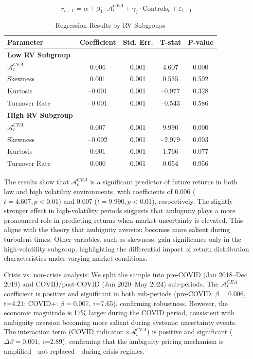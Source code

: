 \documentclass[preprint,12pt,authoryear]{elsarticle}
\renewcommand{\textcolor}[2]{\begingroup\color{#1}#2\endgroup}
\begin{document}
\begin{equation}
r_{t+1} = \alpha + \beta_1 \cdot \mathcal{A}^{CEA}_t + \gamma_1 \cdot \mathrm{Controls}_t + \varepsilon_{t+1}
\end{equation}

\begin{table}[h!]
\centering
\caption{Regression Results by RV Subgroups}
\label{tab:rv_subgroup_results}
\begin{tabularx}{\textwidth}{Xcccc}
\toprule
\textbf{Parameter} & \textbf{Coefficient} & \textbf{Std. Err.} & \textbf{T-stat} & \textbf{P-value} \\
\midrule
\textbf{Low RV Subgroup} & & & & \\
\(\mathcal{A}^{CEA}_t\) & 0.006 & 0.001 & 4.607 & 0.000 \\
Skewness & 0.001 & 0.001 & 0.535 & 0.592 \\
Kurtosis & –0.001 & 0.001 & –0.977 & 0.328 \\
Turnover Rate & –0.001 & 0.001 & –0.543 & 0.586 \\
\midrule
\textbf{High RV Subgroup} & & & & \\
\(\mathcal{A}^{CEA}_t\) & 0.007 & 0.001 & 9.990 & 0.000 \\
Skewness & –0.002 & 0.001 & –2.979 & 0.003 \\
Kurtosis & 0.001 & 0.001 & 1.766 & 0.077 \\
Turnover Rate & 0.000 & 0.001 & 0.054 & 0.956 \\
\bottomrule
\end{tabularx}
\end{table}

The results show that $\mathcal{A}^{CEA}_t$ is a significant predictor of future returns in both low and high volatility environments, with coefficients of 0.006 ($t = 4.607, p < 0.01$) and 0.007 ($t = 9.990, p < 0.01$), respectively. The slightly stronger effect in high-volatility periods suggests that ambiguity plays a more pronounced role in predicting returns when market uncertainty is elevated. This aligns with the theory that ambiguity aversion becomes more salient during turbulent times. Other variables, such as skewness, gain significance only in the high-volatility subgroup, highlighting the differential impact of return distribution characteristics under varying market conditions.

\textcolor{red}{Crisis vs. non-crisis analysis: We split the sample into pre-COVID (Jan 2018–Dec 2019) and COVID/post-COVID (Jan 2020–May 2024) sub-periods. The $\mathcal{A}^{CEA}_t$ coefficient is positive and significant in both sub-periods (pre-COVID: $\beta=0.006$, t=4.21; COVID+: $\beta=0.007$, t=7.65), confirming robustness. However, the economic magnitude is 17\% larger during the COVID period, consistent with ambiguity aversion becoming more salient during systemic uncertainty events. The interaction term (COVID indicator $\times \mathcal{A}^{CEA}_t$) is positive and significant ($\Delta\beta=0.001$, t=2.89), confirming that the ambiguity pricing mechanism is amplified—not replaced—during crisis regimes.}
\end{document}
